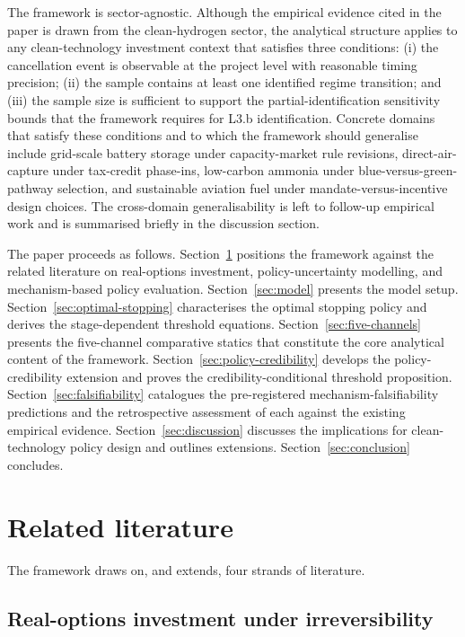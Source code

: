\documentclass[12pt,a4paper]{article}
\theoremstyle{plain}
\theoremstyle{definition}
\begin{document}
The framework is sector-agnostic. Although the empirical evidence cited in the paper is drawn from the clean-hydrogen sector, the analytical structure applies to any clean-technology investment context that satisfies three conditions: (i) the cancellation event is observable at the project level with reasonable timing precision; (ii) the sample contains at least one identified regime transition; and (iii) the sample size is sufficient to support the partial-identification sensitivity bounds that the framework requires for L3.b identification. Concrete domains that satisfy these conditions and to which the framework should generalise include grid-scale battery storage under capacity-market rule revisions, direct-air-capture under tax-credit phase-ins, low-carbon ammonia under blue-versus-green-pathway selection, and sustainable aviation fuel under mandate-versus-incentive design choices. The cross-domain generalisability is left to follow-up empirical work and is summarised briefly in the discussion section.

The paper proceeds as follows. Section~\ref{sec:literature} positions the framework against the related literature on real-options investment, policy-uncertainty modelling, and mechanism-based policy evaluation. Section~\ref{sec:model} presents the model setup. Section~\ref{sec:optimal-stopping} characterises the optimal stopping policy and derives the stage-dependent threshold equations. Section~\ref{sec:five-channels} presents the five-channel comparative statics that constitute the core analytical content of the framework. Section~\ref{sec:policy-credibility} develops the policy-credibility extension and proves the credibility-conditional threshold proposition. Section~\ref{sec:falsifiability} catalogues the pre-registered mechanism-falsifiability predictions and the retrospective assessment of each against the existing empirical evidence. Section~\ref{sec:discussion} discusses the implications for clean-technology policy design and outlines extensions. Section~\ref{sec:conclusion} concludes.

\section{Related literature}
\label{sec:literature}

The framework draws on, and extends, four strands of literature.

\subsection{Real-options investment under irreversibility}
\label{sec:lit-real-options}
\end{document}
